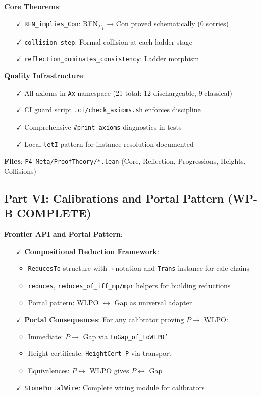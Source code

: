 \documentclass[11pt]{article}
\theoremstyle{definition}
\theoremstyle{remark}
\begin{document}
\textbf{Core Theorems}:
\begin{itemize}
\item[$\checkmark$] \texttt{RFN\_implies\_Con}: RFN$_{\Sigma^0_1}$ → Con proved schematically (0 sorries)
\item[$\checkmark$] \texttt{collision\_step}: Formal collision at each ladder stage
\item[$\checkmark$] \texttt{reflection\_dominates\_consistency}: Ladder morphism
\end{itemize}

\textbf{Quality Infrastructure}:
\begin{itemize}
\item[$\checkmark$] All axioms in \texttt{Ax} namespace (21 total: 12 dischargeable, 9 classical)
\item[$\checkmark$] CI guard script \texttt{.ci/check\_axioms.sh} enforces discipline
\item[$\checkmark$] Comprehensive \texttt{\#print axioms} diagnostics in tests
\item[$\checkmark$] Local \texttt{letI} pattern for instance resolution documented
\end{itemize}

\textbf{Files}: \texttt{P4\_Meta/ProofTheory/*.lean} (Core, Reflection, Progressions, Heights, Collisions)

\subsection{Part VI: Calibrations and Portal Pattern (WP-B COMPLETE)}

\textbf{Frontier API and Portal Pattern}:
\begin{itemize}
\item[$\checkmark$] \textbf{Compositional Reduction Framework}:
  \begin{itemize}
  \item \texttt{ReducesTo} structure with \texttt{⟶} notation and \texttt{Trans} instance for calc chains
  \item \texttt{reduces}, \texttt{reduces\_of\_iff\_mp/mpr} helpers for building reductions
  \item Portal pattern: WLPO $\leftrightarrow$ Gap as universal adapter
  \end{itemize}
\item[$\checkmark$] \textbf{Portal Consequences}: For any calibrator proving $P \to$ WLPO:
  \begin{itemize}
  \item Immediate: $P \to$ Gap via \texttt{toGap\_of\_toWLPO'}
  \item Height certificate: \texttt{HeightCert P} via transport
  \item Equivalences: $P \leftrightarrow$ WLPO gives $P \leftrightarrow$ Gap
  \end{itemize}
\item[$\checkmark$] \texttt{StonePortalWire}: Complete wiring module for calibrators
\end{itemize}
\end{document}
